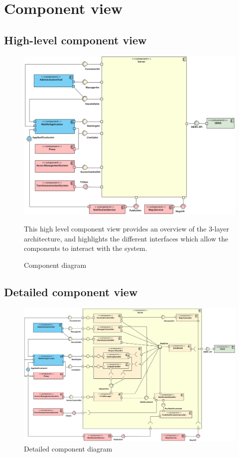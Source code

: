 \documentclass[a4paper,oneside,11pt]{book}
\newcommand{\captiondd}[2]{\caption{#1}\par\begin{center}\vspace{-.01\textheight}\small#2.\end{center}}
\begin{document}
    \newpage
    \section{Component view}
    \subsection{High-level component view}
    \begin{figure}[H]
        \centering
        \includegraphics[width=\textwidth, height=\textheight, keepaspectratio]{pictures/component_diagram_hl}
        \captiondd{Component diagram}{This high level component view provides an overview of the 3-layer architecture, and highlights the different interfaces which allow the components to interact with the system}
        \label{figure:component_diagram_hl}
    \end{figure}
    
    \subsection{Detailed component view}
    \begin{figure}[H]
        \centering
        \includegraphics[width=\textwidth, height=\textheight, keepaspectratio]{pictures/component_diagram_exp}
        \caption{Detailed component diagram}
        \label{figure:component_diagram_exp}
    \end{figure}
    
\end{document}
